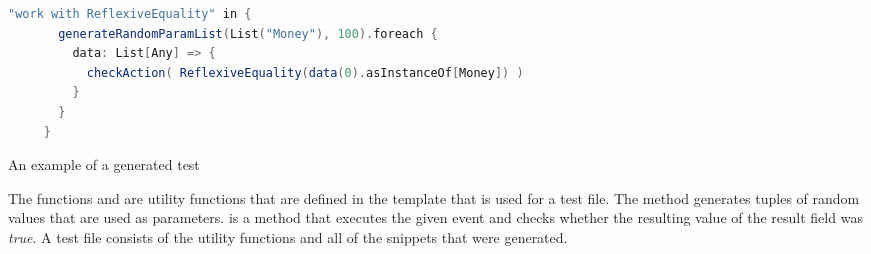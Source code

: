 \FloatBarrier
\begin{sourcecode}[h!]
\begin{lstlisting}[language=Scala]
    "work with ReflexiveEquality" in {
       generateRandomParamList(List("Money"), 100).foreach {
         data: List[Any] => {
           checkAction( ReflexiveEquality(data(0).asInstanceOf[Money]) )
         }
       }
     }
\end{lstlisting}
\caption{An example of a generated test}
\label{lst:ch3_generated_test_example}
\end{sourcecode}
\FloatBarrier
The functions  and  are utility functions that are defined in the template that is used for a test file. The  method generates tuples of random values that are used as parameters.  is a method that executes the given event and checks whether the resulting value of the result field was \textit{true}. A test file consists of the utility functions and all of the snippets that were generated.

